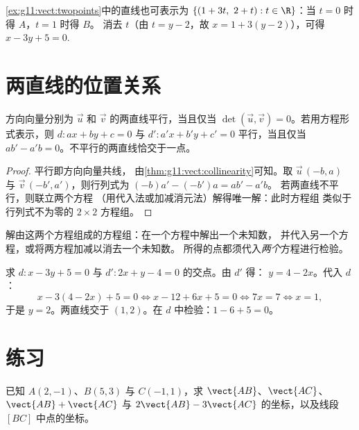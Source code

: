 \begin{example}
\cref{ex:g11:vect:twopoints}中的直线也可表示为
$\{(1 + 3t,\ 2 + t) : t \in \R\}$：当 $t = 0$ 时得 $A$，$t = 1$ 时得 $B$。
消去 $t$（由 $t = y - 2$，故 $x = 1 + 3(y-2)$），可得
$x - 3y + 5 = 0$.
\end{example}

\section{两直线的位置关系}

\begin{proposition}[平行或相交]\label{prop:g11:vect:positions}
方向向量分别为 $\vec u$ 和 $\vec v$ 的两直线平行，当且仅当
$\det(\vec u, \vec v) = 0$。若用方程形式表示，则 $d : ax + by + c =
0$ 与 $d' : a'x + b'y + c' = 0$ 平行，当且仅当
$ab' - a'b = 0$。不平行的两直线恰交于一点。
\end{proposition}

\begin{proof}
平行即方向向量共线，
由\cref{thm:g11:vect:collinearity}可知。取 $\vec u\,(-b, a)$ 与
$\vec v\,(-b', a')$，则行列式为 $(-b)a' - (-b')a = ab' - a'b$。
若两直线不平行，则联立两个方程
（用代入法或加减消元法）解得唯一解：此时方程组
类似于行列式不为零的 $2 \times 2$ 方程组。
\end{proof}

\begin{method}[两直线的交点]\label{met:g11:vect:intersection}
解由这两个方程组成的方程组：在一个方程中解出一个未知数，
并代入另一个方程，或将两方程加减以消去一个未知数。
所得的点都须代入\emph{两个}方程进行检验。
\end{method}

\begin{example}\label{ex:g11:vect:intersection}
求 $d: x - 3y + 5 = 0$ 与 $d': 2x + y - 4 = 0$ 的交点。由 $d'$ 得：
$y = 4 - 2x$。代入 $d$：
\[
x - 3(4 - 2x) + 5 = 0
\iff x - 12 + 6x + 5 = 0
\iff 7x = 7
\iff x = 1,
\]
于是 $y = 2$。两直线交于 $(1, 2)$。在 $d$ 中检验：$1 - 6 + 5 = 0$。
\end{example}

\section{练习}

\begin{exercise}[$\star$]\label{exo:g11:vect:1}
已知 $A(2, -1)$、$B(5, 3)$ 与 $C(-1, 1)$，求
$\vect{AB}$、$\vect{AC}$、$\vect{AB} + \vect{AC}$ 与 $2\vect{AB} -
3\vect{AC}$ 的坐标，以及线段 $[BC]$ 中点的坐标。
\end{exercise}

